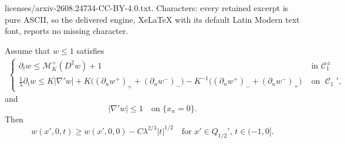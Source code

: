 \documentclass[10pt,a4paper]{amsart}
\DeclareMathOperator{\C}{\mathcal{C}}
\newcommand*{\Mp}{\mathcal{M}_{K}^{+}}
\newcommand{\p}{\partial}
\begin{document}
licenses/arxiv-2608.24734-CC-BY-4.0.txt. Characters: every retained excerpt is pure ASCII, so the delivered engine, XeLaTeX with its default Latin Modern text font, reports no missing character.
\begin{Lemma} \label{lm:lipschitz_trace}
    Assume that $w\leq 1$ satisfies 
    \begin{align}\label{eq:pucci_trans}
        \begin{cases}
            \p_t w \leq \Mp(D^2w)+1 &\mbox{ in } \C_1^\pm\\
              \frac{1}{\lambda} \p_t w \leq K |\nabla' w| + K\big( (\p_n w^+)_+ + (\p_n w^-)_- \big) - K^{-1}\big( (\p_n w^+)_- + (\p_n w^-)_+ \big)& \text{ on }\C_{1}',
        \end{cases}
    \end{align}
    and 
    \[
    |\nabla'w| \leq 1 \quad \text{on }\{x_n=0 \}.
    \]
    Then 
    \[
    w(x',0,t) \geq w(x',0,0) - C \lambda^{2/3} |t|^{1/2} \quad \text{for }x' \in Q_{1/2}', \, t \in (-1,0].
    \]
\end{Lemma}
\end{document}
